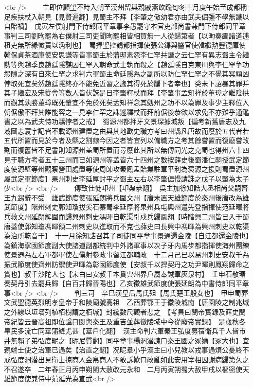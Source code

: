 <br />
　　主即位顧望不時入朝至漢州留與親戚燕飲踰旬冬十月庚午始至成都稱足疾扶杖入朝見【見賢遍翻】見蜀主不拜【李肇之傲幼君亦由武夫倔彊不學無識以自貽禍】　戊寅左僕射門下侍郎同平章事李愚罷守本官吏部尚書兼門下侍郎同平章事判三司劉昫罷為右僕射三司吏聞昫罷相皆相賀無一人從歸第者【以昫奏蠲諸道逋租吏無所緣徵責以漁利也】　蜀捧聖控鶴都指揮使張公鐸與醫官使韓繼勲豐德庫使韓保貞茶酒庫使安思謙等皆事蜀主於藩邸素怨李仁罕共譛之云仁罕有異志蜀主令繼勲等與趙季良趙廷隱謀因仁罕入朝命武士執而殺之【趙廷隱自克東川與李仁罕争功怨隙之深有自來仁罕之求判六軍蜀主命廷隱為之副所以防仁罕仁罕之不覺其冥頑凶悖取死宜矣然趙廷隱終亦不能免近習之讒其得死於牖下者幸也】癸未下詔暴其罪并其子繼宏及宋從會等數人皆伏誅是日李肇釋杖而拜【李肇事孟知祥於董璋之難陰拱而觀其孰勝董璋既死肇宜不免於死矣孟知祥念其劔州之功不以為罪及事少主釋位入朝倨傲不拜其誰能容之一見李仁罕之誅遽釋杖而拜前倨後恭欲以求免不亦難乎通鑑書之以為武夫恃功驕悖者之戒】　蜀源州都押牙文景琛據城叛【徧考新舊唐志及九域圖志寰宇記皆不載源州建置之由與其地歐史職方考曰州縣凡唐故而廢於五代者若五代所置而見於今者及縣之割隷今因之者皆宜列以備職方之考其餘嘗置而復廢嘗改割而復舊皆不足書則知源州盖蜀所置而尋廢此其所以無傳同光之克蜀也得州六十四見于職方考者五十三州而已如源州等盖皆六十四州之數按薛史後蜀潘仁嗣授武定節度使源壁等州觀察營田處置等使周師攻秦鳳孟貽業駐軍平利為褒源之援則蜀置源州屬武定軍節度】果州刺史李延厚討平之蜀主左右以李肇倨慢請誅之戊子以肇為太子少<br />
<br />
　　傅致仕徙卭州【卭渠恭翻】　吳主加徐知誥大丞相尚父嗣齊王九錫辭不受　雄武節度使張延朗將兵圍文州【唐末置天雄節度於秦州後唐改為雄武節度】階州刺史郭知瓊拔尖石寨蜀李延厚將果州兵屯興州遣先登指揮使范延暉將兵救文州延朗解圍而歸興州刺史馮暉自乾渠引戍兵歸鳳翔【時階興二州皆已入于蜀唐蓋使郭知瓊馮暉領二州刺史以進取而不克也薛史曰長興中馮暉為興州刺史以乾渠為治所乾音干】　十一月徐知誥召其子司徒同平章事景通還金陵【自江都還金陵也】為鎮海寧國節度副大使諸道副都統判中外諸軍事以次子牙内馬步都指揮使海州團練使景遷為左右軍都軍使左僕射參政事留江都輔政　十二月己巳以易州刺史安叔千為振武節度使齊州防禦使尹暉為彰國節度使【安叔千以捍契丹之功尹暉則鳳翔歸命之賞也】叔千沙陀人也【宋白曰安叔千本貫雲州界戶屬奉誠軍灰泉村】　壬申石敬瑭奏契丹引去罷兵歸【自百井歸晉陽也】乙亥徵雄武節度使張延朗為中書侍郎同平章事<br />
<br />
　　判三司　辛巳漢皇后馬氏殂【馬氏楚王殷女也】　甲申蜀葬文武聖德英烈明孝皇帝于和陵廟號高祖　乙酉葬鄂王于徽陵城南【唐園陵之制兆域之外繚以垣墻列植栢樹謂之栢城】封纔數尺觀者悲之　【考異曰閔帝實録及薛史閔帝紀皆云晉高祖即位諡曰閔與秦王及重吉並葬徽陵域中今從廢帝實録】　是歲秋冬旱民多流亡同華蒲絳尤甚【華戶化翻】　漢主命判六軍秦王弘度募宿衛兵千人皆市井無賴子弟弘度昵之【昵尼質翻】同平章事楊洞潜諫曰秦王國之冢嫡【冢大也】宜親端士使之治軍已過矣【治直之翻】况昵羣小乎漢主曰小兒教以戎事過煩公憂終不戒弘度洞潜出見衛士掠商人金帛商人不敢訴歎曰政亂如此安用宰相因謝病歸第久之不召遂卒　二年春正月丙申朔閩大赦改元永和　二月丙寅朔蜀大赦甲戌以樞密使天雄節度使兼侍中范延光為宣武<br />
